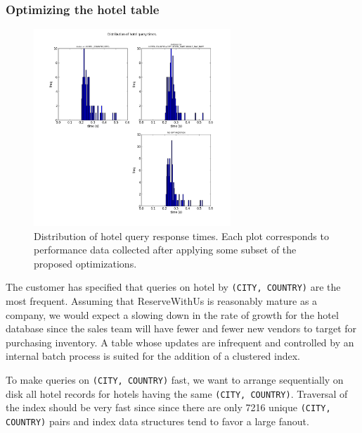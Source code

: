 \documentclass[letterpaper]{article}%
\begin{document}
\subsubsection{Optimizing the hotel table}

\begin{figure}[h!]
  \centering
  \includegraphics[width=0.66\textwidth]{../ReserveWithUsApp/benchmark_data/0.png}
  \caption{Distribution of hotel query response times. Each plot corresponds to
    performance data collected after applying some subset of the proposed
    optimizations.}
  \label{fig:hotelqueries}
\end{figure}

The customer has specified that queries on hotel by \texttt{(CITY, COUNTRY)}
are the most frequent. Assuming that ReserveWithUs is reasonably mature as a
company, we would expect a slowing down in the rate of growth for the hotel
database since the sales team will have fewer and fewer new vendors to target
for purchasing inventory. A table whose updates are infrequent and controlled
by an internal batch process is suited for the addition of a clustered index.

To make queries on \texttt{(CITY, COUNTRY)} fast, we want to arrange
sequentially on disk all hotel records for hotels having the same
\texttt{(CITY, COUNTRY)}. Traversal of the index should be very fast since
since there are only 7216 unique \texttt{(CITY, COUNTRY)} pairs and index data
structures tend to favor a large fanout.
\end{document}
